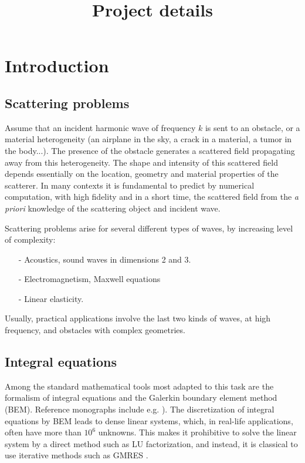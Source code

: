 \documentclass[]{article}
\title{Project details}
\date{}
\author{}
\begin{document}
\maketitle

\section{Introduction}


\subsection*{Scattering problems}	

Assume that an incident harmonic wave of frequency $k$ is sent to an obstacle, or a material heterogeneity (an airplane in the sky, a crack in a material, a tumor in the body...). The presence of the obstacle generates a scattered field propagating away from this heterogeneity. The shape and intensity of this scattered field depends essentially on the location, geometry and material properties of the scatterer. In many contexts it is fundamental to predict by numerical computation, with high fidelity and in a short time, the scattered field from the \textit{a priori} knowledge of the scattering object and incident wave. 

Scattering problems arise for several different types of waves, by increasing level of complexity:
\begin{itemize}\itemsep-.2em 
	\item[-] Acoustics, sound waves in dimensions 2 and 3.
	\item[-] Electromagnetism, Maxwell equations
	\item[-] Linear elasticity. 
\end{itemize} 
Usually, practical applications involve the last two kinds of waves, at high frequency, and obstacles with complex geometries.  

\subsection*{Integral equations}

Among the standard mathematical tools most adapted to this task are the formalism of integral equations and the Galerkin boundary element method (BEM). Reference monographs include e.g. \cite{mclean2000strongly,sauter2010boundary}). The discretization of integral equations by BEM leads to dense linear systems, which, in real-life applications, often have more than $10^6$ unknowns. This makes it prohibitive to solve the linear system by a direct method such as LU factorization, and instead, it is classical to use iterative methods such as GMRES \cite{saad1986gmres}.
\end{document}

